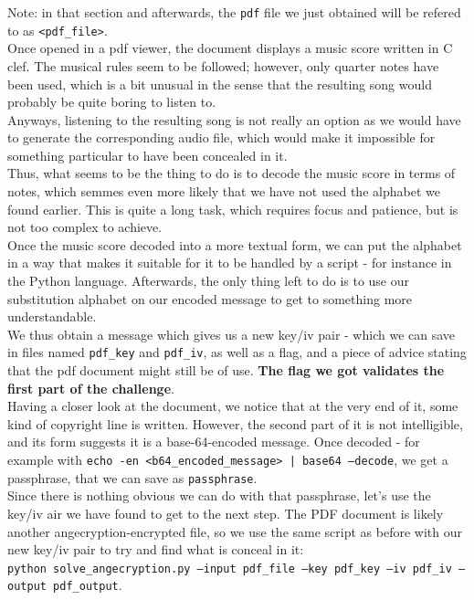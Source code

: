 \documentclass[12pt,a4paper]{article}
\begin{document}
    Note: in that section and afterwards, the \texttt{pdf} file we just obtained will be refered to as \texttt{<pdf\_file>}.\\

    Once opened in a pdf viewer, the document displays a music score written in
    C clef. The musical rules seem to be followed; however, only quarter notes
    have been used, which is a bit unusual in the sense that the resulting song
    would probably be quite boring to listen to.\\

    Anyways, listening to the resulting song is not really an option as we
    would have to generate the corresponding audio file, which would make it
    impossible for something particular to have been concealed in it.\\

    Thus, what seems to be the thing to do is to decode the music score in
    terms of notes, which semmes even more likely that we have not used the
    alphabet we found earlier. This is quite a long task, which requires focus
    and patience, but is not too complex to achieve.\\
    
    Once the music score decoded into a more textual form, we can put the
    alphabet in a way that makes it suitable for it to be handled by a script -
    for instance in the Python language. Afterwards, the only thing left to do
    is to use our substitution alphabet on our encoded message to get to
    something more understandable.\\

    We thus obtain a message which gives us a new key/iv pair - which we can
    save in files named \texttt{pdf\_key} and \texttt{pdf\_iv}, as well as a
    flag, and a piece of advice stating that the pdf document might still be of
    use.  \textbf{The flag we got validates the first part of the challenge}.\\

    Having a closer look at the document, we notice that at the very end of it,
    some kind of copyright line is written. However, the second part of it is
    not intelligible, and its form suggests it is a base-64-encoded message.
    Once decoded - for example with \texttt{echo -en <b64\_encoded\_message> |
    base64 --decode}, we get a passphrase, that we can save as
    \texttt{passphrase}.\\

    Since there is nothing obvious we can do with that passphrase, let's use
    the key/iv air we have found to get to the next step. The PDF document is
    likely another angecryption-encrypted file, so we use the same script as
    before with our new key/iv pair to try and find what is conceal in it:\\
    \texttt{python solve\_angecryption.py --input pdf\_file --key pdf\_key --iv
    pdf\_iv --output pdf\_output}.\\
\end{document}
